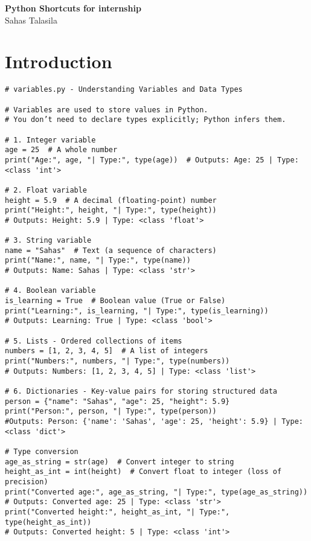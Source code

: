 

\date{}




\onehalfspacing
\begin{titlepage}
    \centering
    \vspace*{2cm}
    \Huge{\textbf{Python Shortcuts for internship}} \\[1.5cm]
    Sahas Talasila \\[1cm]
    \vfill
\end{titlepage}

\tableofcontents
\newpage

\section{Introduction}

\begin{verbatim}
# variables.py - Understanding Variables and Data Types

# Variables are used to store values in Python.
# You don’t need to declare types explicitly; Python infers them.

# 1. Integer variable
age = 25  # A whole number
print("Age:", age, "| Type:", type(age))  # Outputs: Age: 25 | Type: <class 'int'>

# 2. Float variable
height = 5.9  # A decimal (floating-point) number
print("Height:", height, "| Type:", type(height))  
# Outputs: Height: 5.9 | Type: <class 'float'>

# 3. String variable
name = "Sahas"  # Text (a sequence of characters)
print("Name:", name, "| Type:", type(name))  
# Outputs: Name: Sahas | Type: <class 'str'>

# 4. Boolean variable
is_learning = True  # Boolean value (True or False)
print("Learning:", is_learning, "| Type:", type(is_learning))  
# Outputs: Learning: True | Type: <class 'bool'>

# 5. Lists - Ordered collections of items
numbers = [1, 2, 3, 4, 5]  # A list of integers
print("Numbers:", numbers, "| Type:", type(numbers))  
# Outputs: Numbers: [1, 2, 3, 4, 5] | Type: <class 'list'>

# 6. Dictionaries - Key-value pairs for storing structured data
person = {"name": "Sahas", "age": 25, "height": 5.9}
print("Person:", person, "| Type:", type(person))  
#Outputs: Person: {'name': 'Sahas', 'age': 25, 'height': 5.9} | Type: <class 'dict'>

# Type conversion
age_as_string = str(age)  # Convert integer to string
height_as_int = int(height)  # Convert float to integer (loss of precision)
print("Converted age:", age_as_string, "| Type:", type(age_as_string))  
# Outputs: Converted age: 25 | Type: <class 'str'>
print("Converted height:", height_as_int, "| Type:", type(height_as_int))  
# Outputs: Converted height: 5 | Type: <class 'int'>
\end{verbatim}

